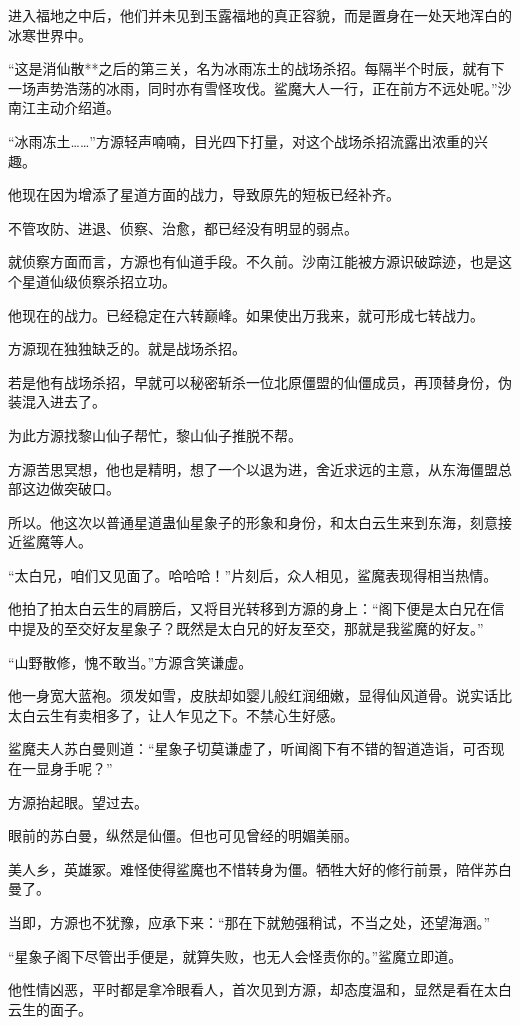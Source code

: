 \begin{this_body}
进入福地之中后，他们并未见到玉露福地的真正容貌，而是置身在一处天地浑白的冰寒世界中。

“这是消仙散**之后的第三关，名为冰雨冻土的战场杀招。每隔半个时辰，就有下一场声势浩荡的冰雨，同时亦有雪怪攻伐。鲨魔大人一行，正在前方不远处呢。”沙南江主动介绍道。

“冰雨冻土……”方源轻声喃喃，目光四下打量，对这个战场杀招流露出浓重的兴趣。

他现在因为增添了星道方面的战力，导致原先的短板已经补齐。

不管攻防、进退、侦察、治愈，都已经没有明显的弱点。

就侦察方面而言，方源也有仙道手段。不久前。沙南江能被方源识破踪迹，也是这个星道仙级侦察杀招立功。

他现在的战力。已经稳定在六转巅峰。如果使出万我来，就可形成七转战力。

方源现在独独缺乏的。就是战场杀招。

若是他有战场杀招，早就可以秘密斩杀一位北原僵盟的仙僵成员，再顶替身份，伪装混入进去了。

为此方源找黎山仙子帮忙，黎山仙子推脱不帮。

方源苦思冥想，他也是精明，想了一个以退为进，舍近求远的主意，从东海僵盟总部这边做突破口。

所以。他这次以普通星道蛊仙星象子的形象和身份，和太白云生来到东海，刻意接近鲨魔等人。

“太白兄，咱们又见面了。哈哈哈！”片刻后，众人相见，鲨魔表现得相当热情。

他拍了拍太白云生的肩膀后，又将目光转移到方源的身上：“阁下便是太白兄在信中提及的至交好友星象子？既然是太白兄的好友至交，那就是我鲨魔的好友。”

“山野散修，愧不敢当。”方源含笑谦虚。

他一身宽大蓝袍。须发如雪，皮肤却如婴儿般红润细嫩，显得仙风道骨。说实话比太白云生有卖相多了，让人乍见之下。不禁心生好感。

鲨魔夫人苏白曼则道：“星象子切莫谦虚了，听闻阁下有不错的智道造诣，可否现在一显身手呢？”

方源抬起眼。望过去。

眼前的苏白曼，纵然是仙僵。但也可见曾经的明媚美丽。

美人乡，英雄冢。难怪使得鲨魔也不惜转身为僵。牺牲大好的修行前景，陪伴苏白曼了。

当即，方源也不犹豫，应承下来：“那在下就勉强稍试，不当之处，还望海涵。”

“星象子阁下尽管出手便是，就算失败，也无人会怪责你的。”鲨魔立即道。

他性情凶恶，平时都是拿冷眼看人，首次见到方源，却态度温和，显然是看在太白云生的面子。


\end{this_body}
